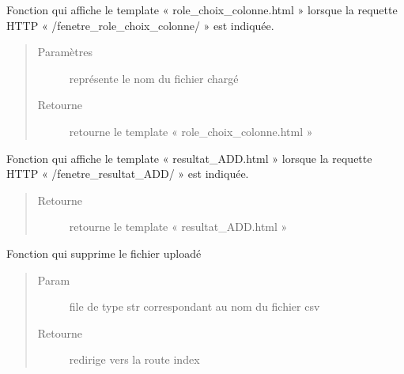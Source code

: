 \documentclass[letterpaper,10pt,french]{sphinxmanual}
\begin{document}
\begin{fulllineitems}
\label{\detokenize{gestionFlux:interface_web.gestionFlux.fenetre_role_choix_colonne}}
Fonction qui affiche le template « role\_choix\_colonne.html » lorsque la requette HTTP « /fenetre\_role\_choix\_colonne/ » est indiquée.
\begin{quote}\begin{description}
\item[{Paramètres}] \leavevmode
{} \textendash{} représente le nom du fichier chargé

\item[{Retourne}] \leavevmode
retourne le template « role\_choix\_colonne.html »

\end{description}\end{quote}

\end{fulllineitems}


\begin{fulllineitems}
\label{\detokenize{gestionFlux:interface_web.gestionFlux.fenetre_resultat_ADD}}
Fonction qui affiche le template « resultat\_ADD.html » lorsque la requette HTTP « /fenetre\_resultat\_ADD/ » est indiquée.
\begin{quote}\begin{description}
\item[{Retourne}] \leavevmode
retourne le template « resultat\_ADD.html »

\end{description}\end{quote}

\end{fulllineitems}


\begin{fulllineitems}
\label{\detokenize{gestionFlux:interface_web.gestionFlux.remove}}
Fonction qui supprime le fichier uploadé
\begin{quote}\begin{description}
\item[{Param}] \leavevmode
file de type str correspondant au nom du fichier csv

\item[{Retourne}] \leavevmode
redirige vers la route index

\end{description}\end{quote}

\end{fulllineitems}
\end{document}
